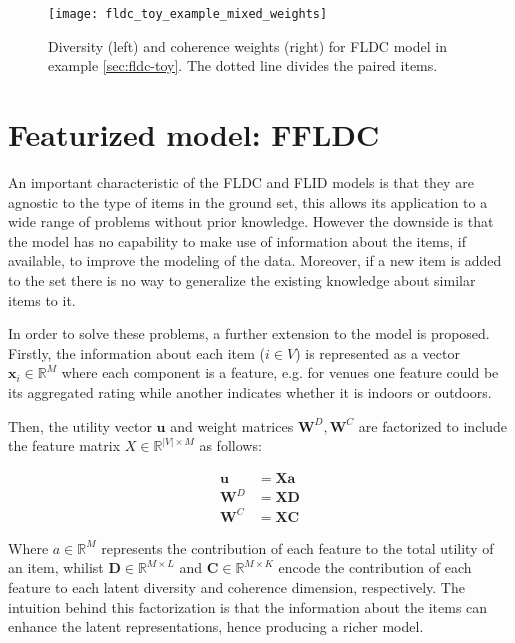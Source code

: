 \begin{figure}
  \centering
  \texttt{[image: fldc\_toy\_example\_mixed\_weights]}
  \caption{Diversity (left) and coherence weights (right) for FLDC model in example \ref{sec:fldc-toy}. The dotted line divides the paired items.}
  \label{fig:fldc-toy-mixed-weights}
\end{figure}


\section{Featurized model: FFLDC}

An important characteristic of the FLDC and FLID models is that they are agnostic to the type of items in the ground set, this allows its application to a wide range of problems without prior knowledge. However the downside is that the model has no capability to make use of information about the items, if available, to improve the modeling of the data. Moreover, if a new item is added to the set there is no way to generalize the existing knowledge about similar items to it.

In order to solve these problems, a further extension to the model is proposed. Firstly, the information about each item ($i \in V$) is represented as a vector $\mathbf{x}_{i} \in \mathbb{R}^{M}$ where each component is a feature, e.g. for venues one feature could be its aggregated rating while another indicates whether it is indoors or outdoors.

Then, the utility vector $\mathbf{u}$ and weight matrices $\mathbf{W}^{D}, \mathbf{W}^{C}$ are factorized to include the feature matrix $X \in \mathbb{R}^{|V| \times M}$ as follows:

\begin{align}
  \mathbf{u} &= \mathbf{Xa}   \label{eq:ffldc-factorization-1} \\
  \mathbf{W}^{D} &= \mathbf{XD}  \label{eq:ffldc-factorization-2} \\
  \mathbf{W}^{C} &= \mathbf{XC}
  \label{eq:ffldc-factorization-3}
\end{align} 

Where $a \in \mathbb{R}^{M}$ represents the contribution of each feature to the total utility of an item, whilist $\mathbf{D} \in \mathbb{R}^{M \times L}$ and $\mathbf{C} \in \mathbb{R}^{M \times K}$ encode the contribution of each feature to each latent diversity and coherence dimension, respectively. The intuition behind this factorization is that the information about the items can enhance the latent representations, hence producing a richer model.

